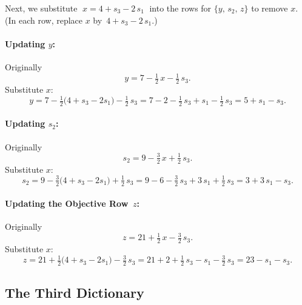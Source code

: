 Next, we substitute 
\(\;x = 4 + s_3 - 2\,s_1\;\)
into the rows for \(\{y,\,s_2,\,z\}\) to remove \(x\).  
(In each row, replace \(x\) by \(\,4 + s_3 - 2\,s_1\).)

\paragraph{Updating \(y\):}

Originally 
\[
y = 7 - \tfrac12\,x - \tfrac12\,s_3.
\]
Substitute \(x\):
\[
y
= 7 
- \tfrac12\bigl(4 + s_3 - 2s_1\bigr)
- \tfrac12\,s_3
=
7 - 2 - \tfrac12\,s_3 + s_1 - \tfrac12\,s_3
=
5 + s_1 - s_3.
\]

\paragraph{Updating \(s_2\):}

Originally
\[
s_2 = 9 - \tfrac32\,x + \tfrac12\,s_3.
\]
Substitute \(x\):
\[
s_2
= 9 
- \tfrac32\bigl(4 + s_3 - 2s_1\bigr)
+ \tfrac12\,s_3
= 
9 - 6 - \tfrac32\,s_3 + 3\,s_1 + \tfrac12\,s_3
=
3 + 3\,s_1 - s_3.
\]

\paragraph{Updating the Objective Row \(\,z\):}

Originally
\[
z = 21 + \tfrac12\,x - \tfrac32\,s_3.
\]
Substitute \(x\):
\[
z
= 
21 
+ \tfrac12\bigl(4 + s_3 - 2s_1\bigr)
- \tfrac32\,s_3
=
21 + 2 + \tfrac12\,s_3 - s_1 - \tfrac32\,s_3
=
23 - s_1 - s_3.
\]

\subsection*{The Third Dictionary}

